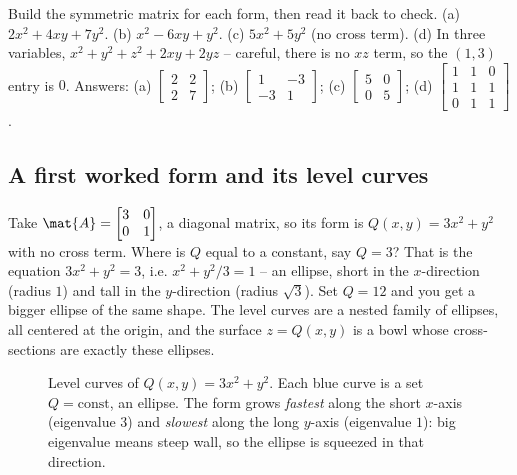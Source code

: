 \begin{labbox}
Build the symmetric matrix for each form, then read it back to check.
(a) $2x^2 + 4xy + 7y^2$. (b) $x^2 - 6xy + y^2$. (c) $5x^2 + 5y^2$ (no cross term).
(d) In three variables, $x^2 + y^2 + z^2 + 2xy + 2yz$ -- careful, there is no $xz$
term, so the $(1,3)$ entry is $0$. Answers:
(a) $\begin{bmatrix}2&2\\2&7\end{bmatrix}$;
(b) $\begin{bmatrix}1&-3\\-3&1\end{bmatrix}$;
(c) $\begin{bmatrix}5&0\\0&5\end{bmatrix}$;
(d) $\begin{bmatrix}1&1&0\\1&1&1\\0&1&1\end{bmatrix}$.
\end{labbox}

\subsection{A first worked form and its level curves}

Take $\mat{A}=\begin{bmatrix}3&0\\0&1\end{bmatrix}$, a diagonal matrix, so its form
is $Q(x,y)=3x^2+y^2$ with no cross term. Where is $Q$ equal to a constant, say
$Q=3$? That is the equation $3x^2+y^2=3$, i.e. $x^2 + y^2/3 = 1$ -- an ellipse,
short in the $x$-direction (radius $1$) and tall in the $y$-direction (radius
$\sqrt 3$). Set $Q=12$ and you get a bigger ellipse of the same shape. The level
curves are a nested family of ellipses, all centered at the origin, and the surface
$z=Q(x,y)$ is a bowl whose cross-sections are exactly these ellipses.

\begin{figure}[H]
\centering
{}
\caption{Level curves of $Q(x,y)=3x^2+y^2$. Each blue curve is a set $Q=\text{const}$,
an ellipse. The form grows \emph{fastest} along the short $x$-axis (eigenvalue $3$)
and \emph{slowest} along the long $y$-axis (eigenvalue $1$): big eigenvalue means
steep wall, so the ellipse is squeezed in that direction.}
\label{ch36:fig-levelcurves}
\end{figure}


